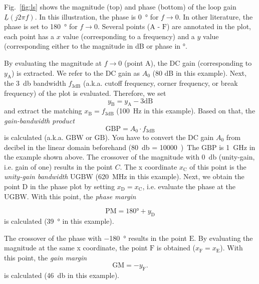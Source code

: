 \documentclass{article}[11pt]
\begin{document}
Fig.~\ref{fig:ls} shows the magnitude (top) and phase (bottom) of the 
loop gain $\underline{L}(j 2 \pi f)$.
In this illustration, the phase is \SI{0}{\degree} for $f \rightarrow 0$.
In other literature, the phase is set to \SI{180}{\degree} for 
$f \rightarrow 0$.
Several points ($\mathrm{A}$ - $\mathrm{F}$) are annotated in the plot, each 
point has a $x$ value (corresponding to a frequency) and a $y$ value 
(corresponding either to the magnitude in dB or phase in \si{\degree}.

\medskip

By evaluating the magnitude at $f \rightarrow 0$ (point $\mathrm{A}$), the
DC gain (corresponding to $y_{\mathrm{A}}$) is extracted.
We refer to the DC gain as $A_0$ (80 dB in this example).
Next, the \SI{3}{\decibel} bandwidth $f_{\mathrm{3dB}}$ 
(a.k.a. cutoff frequency, corner frequency, or break frequency) of the
plot is evaluated. 
Therefore, we set
$$
y_{\mathrm{B}} = y_{\mathrm{A}} - 3 \mathrm{dB}
$$
and extract the matching $x_{\mathrm{B}} = f_{\mathrm{3dB}}$ 
(\SI{100}{\hertz} in this example).
Based on that, the \textit{gain-bandwidth product}
\begin{equation}
\mathrm{GBP} = A_0 \cdot f_{\mathrm{3dB}}
\end{equation}
is calculated (a.k.a. $\mathrm{GBW}$ or $\mathrm{GB}$). 
You have to convert the DC gain $A_0$ from decibel in the linear domain 
beforehand (\SI{80}{\decibel} = \qty{10000}).
The $\mathrm{GBP}$ is \SI{1}{\giga\hertz} in the example shown above.
The crossover of the magnitude with \SI{0}{\decibel} 
(unity-gain, i.e. gain of one) results in the point $C$.
The x coordinate $x_{\mathrm{C}}$ of this point is the 
\textit{unity-gain bandwidth}
$\mathrm{UGBW}$ (\SI{620}{\mega\hertz} in this example).
Next, we obtain the point $\mathrm{D}$ in the phase plot by setting 
$x_{\mathrm{D}} = x_{\mathrm{C}}$, i.e. evaluate the phase at the 
$\mathrm{UGBW}$.
With this point, the \textit{phase margin}

$$
\mathrm{PM} = 180° + y_{\mathrm{D}}
$$
is calculated (\SI{39}{\degree} in this example).

The crossover of the phase with \SI{-180}{\degree} results in the 
point $\mathrm{E}$.
By evaluating the magnitude at the same x coordinate, the point 
$\mathrm{F}$ is obtained ($x_{\mathrm{F}} = x_{\mathrm{E}}$).
With this point, the \textit{gain margin}
$$
\mathrm{GM} = - y_{\mathrm{F}}.
$$
is calculated (\SI{46}{\decibel} in this example).

\printbibliography
\end{document}
